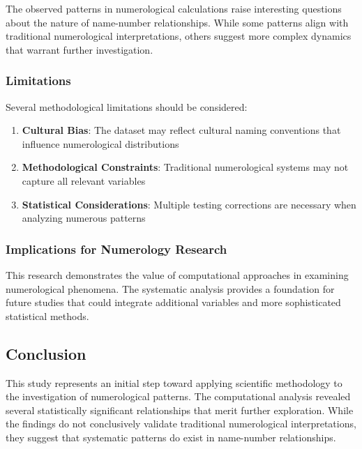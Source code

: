 \documentclass[
  11pt,
]{article}
\providecommand{\tightlist}{%
  \setlength{\itemsep}{0pt}\setlength{\parskip}{0pt}}
\begin{document}
The observed patterns in numerological calculations raise interesting
questions about the nature of name-number relationships. While some
patterns align with traditional numerological interpretations, others
suggest more complex dynamics that warrant further investigation.

\subsubsection{Limitations}\label{limitations}

Several methodological limitations should be considered:

\begin{enumerate}
\def\labelenumi{\arabic{enumi}.}
\tightlist
\item
  \textbf{Cultural Bias}: The dataset may reflect cultural naming
  conventions that influence numerological distributions
\item
  \textbf{Methodological Constraints}: Traditional numerological systems
  may not capture all relevant variables
\item
  \textbf{Statistical Considerations}: Multiple testing corrections are
  necessary when analyzing numerous patterns
\end{enumerate}

\subsubsection{Implications for Numerology
Research}\label{implications-for-numerology-research}

This research demonstrates the value of computational approaches in
examining numerological phenomena. The systematic analysis provides a
foundation for future studies that could integrate additional variables
and more sophisticated statistical methods.

\subsection{Conclusion}\label{conclusion}

This study represents an initial step toward applying scientific
methodology to the investigation of numerological patterns. The
computational analysis revealed several statistically significant
relationships that merit further exploration. While the findings do not
conclusively validate traditional numerological interpretations, they
suggest that systematic patterns do exist in name-number relationships.
\end{document}

